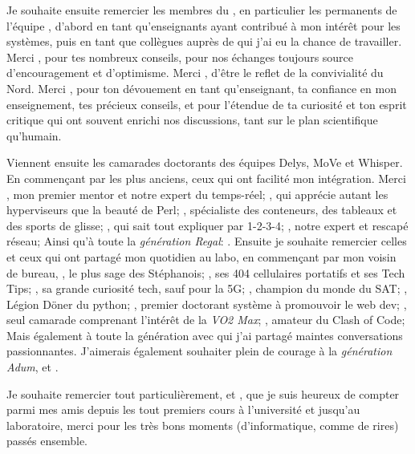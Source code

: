 Je souhaite ensuite remercier les membres du ,
en particulier les permanents de l'équipe ,
d'abord en tant qu'enseignants ayant contribué à mon intérêt pour les 
systèmes,
puis en tant que collègues auprès de qui j'ai eu la chance de travailler.
Merci ,
pour tes nombreux conseils,
pour nos échanges toujours source d'encouragement et d'optimisme.
Merci ,
d'être le reflet de la convivialité du Nord.
Merci ,
pour ton dévouement en tant qu'enseignant,
ta confiance en mon enseignement,
tes précieux conseils,
et pour l'étendue de ta curiosité et ton esprit critique qui ont souvent
enrichi nos discussions,
tant sur le plan scientifique qu'humain.

Viennent ensuite les camarades doctorants des équipes Delys, MoVe et Whisper.
En commençant par les plus anciens, ceux qui ont facilité mon intégration.
Merci , mon premier mentor et notre expert du temps-réel;
, qui apprécie autant les hyperviseurs que la beauté de Perl;
, spécialiste des conteneurs, des tableaux et des sports de glisse;
, qui sait tout expliquer par 1-2-3-4;
, notre expert et rescapé réseau;
Ainsi qu'à toute la \emph{génération Regal}: .
Ensuite je souhaite remercier celles et ceux qui ont partagé mon quotidien au labo,
en commençant par mon voisin de bureau, 
, le plus sage des Stéphanois;
, ses 404 cellulaires portatifs et ses Tech Tips;
, sa grande curiosité tech, sauf pour la 5G;
, champion du monde du SAT;
, Légion Döner du python;
, premier doctorant système à promouvoir le web dev;
, seul camarade comprenant l'intérêt de la \emph{VO2 Max};
, amateur du Clash of Code;
Mais également à toute la génération  avec qui j'ai partagé maintes conversations passionnantes.
J'aimerais également souhaiter plein de courage à la \emph{génération Adum},
 et .

Je souhaite remercier tout particulièrement,
 et ,
que je suis heureux de compter parmi mes amis depuis les tout premiers cours
à l'université et jusqu'au laboratoire,
merci pour les très bons moments (d'informatique, comme de rires) passés ensemble.

